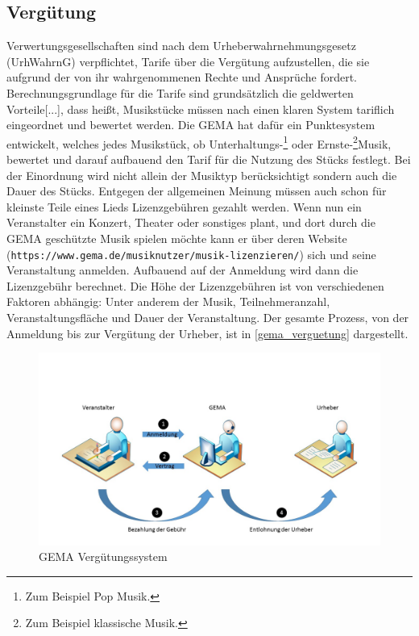 \subsection{Vergütung}
\glqq Verwertungsgesellschaften sind nach dem Urheberwahrnehmungsgesetz (UrhWahrnG) verpflichtet, Tarife über die Vergütung aufzustellen, die sie aufgrund der von ihr wahrgenommenen Rechte und Ansprüche fordert. Berechnungsgrundlage für die Tarife sind grundsätzlich die geldwerten Vorteile[...]\grqq{}, dass heißt, Musikstücke müssen nach einen klaren System tariflich eingeordnet und bewertet werden. Die GEMA hat dafür ein Punktesystem entwickelt, welches jedes Musikstück, ob Unterhaltungs-\footnote{Zum Beispiel Pop Musik.} oder \glqq Ernste\grqq-\footnote{Zum Beispiel klassische Musik.}Musik, bewertet und darauf aufbauend den Tarif für die Nutzung des Stücks festlegt. Bei der Einordnung wird nicht allein der Musiktyp berücksichtigt sondern auch die Dauer des Stücks. Entgegen der allgemeinen Meinung müssen auch schon für kleinste Teile eines Lieds Lizenzgebühren gezahlt werden.
\newline
Wenn nun ein Veranstalter ein Konzert, Theater oder sonstiges plant, und dort durch die GEMA geschützte Musik spielen möchte kann er über deren Website (\texttt{https://www.gema.de/musiknutzer/musik-lizenzieren/}) sich und seine Veranstaltung anmelden. Aufbauend auf der Anmeldung wird dann die Lizenzgebühr berechnet. Die Höhe der Lizenzgebühren ist von verschiedenen Faktoren abhängig: Unter anderem der Musik, Teilnehmeranzahl, Veranstaltungsfläche und Dauer der Veranstaltung.
\newline
\newline
Der gesamte Prozess, von der Anmeldung bis zur Vergütung der Urheber, ist in \vref{gema_verguetung} dargestellt.

\begin{figure}[H] 
\centering 
\includegraphics[scale=0.46]{se-wa-jpg/gema_verguetung} 
\caption[GEMA Vergütungssystem]{GEMA Vergütungssystem} 
\label{gema_verguetung} 
\end{figure}